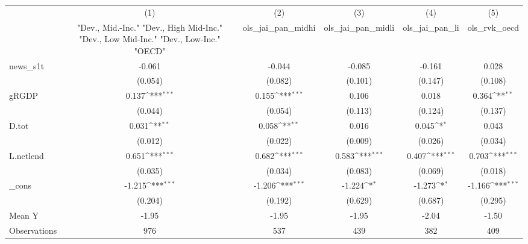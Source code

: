 {
\def\sym#1{\ifmmode^{#1}\else\(^{#1}\)\fi}
\begin{tabular}{l*{5}{c}}
\toprule
            &\multicolumn{1}{c}{(1)}&\multicolumn{1}{c}{(2)}&\multicolumn{1}{c}{(3)}&\multicolumn{1}{c}{(4)}&\multicolumn{1}{c}{(5)}\\
            &\multicolumn{1}{c}{ "Dev., Mid.-Inc." "Dev., High Mid-Inc." "Dev., Low Mid-Inc." "Dev., Low-Inc." "OECD" }&\multicolumn{1}{c}{ols\_jai\_pan\_midhi}&\multicolumn{1}{c}{ols\_jai\_pan\_midli}&\multicolumn{1}{c}{ols\_jai\_pan\_li}&\multicolumn{1}{c}{ols\_rvk\_oecd}\\
\midrule
news\_s1t    &      -0.061         &      -0.044         &      -0.085         &      -0.161         &       0.028         \\
            &     (0.054)         &     (0.082)         &     (0.101)         &     (0.147)         &     (0.108)         \\
\addlinespace
gRGDP       &       0.137\sym{***}&       0.155\sym{***}&       0.106         &       0.018         &       0.364\sym{**} \\
            &     (0.044)         &     (0.054)         &     (0.113)         &     (0.124)         &     (0.137)         \\
\addlinespace
D.tot       &       0.031\sym{**} &       0.058\sym{**} &       0.016         &       0.045\sym{*}  &       0.043         \\
            &     (0.012)         &     (0.022)         &     (0.009)         &     (0.026)         &     (0.034)         \\
\addlinespace
L.netlend   &       0.651\sym{***}&       0.682\sym{***}&       0.583\sym{***}&       0.407\sym{***}&       0.703\sym{***}\\
            &     (0.035)         &     (0.034)         &     (0.083)         &     (0.069)         &     (0.018)         \\
\addlinespace
\_cons      &      -1.215\sym{***}&      -1.206\sym{***}&      -1.224\sym{*}  &      -1.273\sym{*}  &      -1.166\sym{***}\\
            &     (0.204)         &     (0.192)         &     (0.629)         &     (0.687)         &     (0.295)         \\
\midrule
Mean Y      &       -1.95         &       -1.95         &       -1.95         &       -2.04         &       -1.50         \\
Observations&         976         &         537         &         439         &         382         &         409         \\
\bottomrule
\end{tabular}
}
